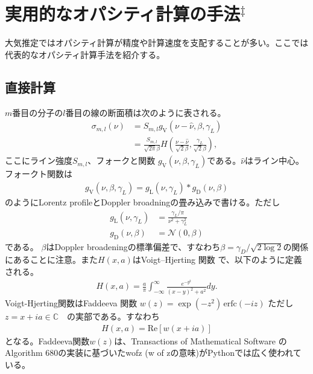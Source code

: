 \section{実用的なオパシティ計算の手法$^\ddagger$}

大気推定ではオパシティ計算が精度や計算速度を支配することが多い。ここでは代表的なオパシティ計算手法を紹介する。

\subsection*{直接計算}

$m$番目の分子の$l$番目の線の断面積は次のように表される。
\begin{align}
  \sigma_{m,l}(\nu) &= S_{m,l} g_\mathrm{V}(\nu - \hat{\nu} , \beta, \gamma_L) \\
  &= \frac{S_{m,l}}{\sqrt{2 \pi} \beta} H\left( \frac{\nu -\hat{\nu}}{\sqrt{2} \beta},\frac{\gamma_L}{\sqrt{2} \beta} \right),
\end{align}
ここにライン強度$S_{m,l}$、フォークと関数 $g_\mathrm{V}(\nu, \beta, \gamma_L)$である。$\hat{\nu} $はライン中心。フォークト関数は
\begin{align}
g_\mathrm{V}(\nu, \beta, \gamma_L) = g_\mathrm{L} (\nu,\gamma_L) \ast g_\mathrm{D} (\nu,\beta) 
\end{align}
のようにLorentz profileとDoppler broadningの畳み込みで書ける。ただし
\begin{align}
 g_\mathrm{L} (\nu,\gamma_L) &= \frac{\gamma_L/\pi}{\nu^2 + \gamma_L^2} \\
 g_\mathrm{D} (\nu,\beta) &= \mathcal{N} (0, \beta)
\end{align}
である。 $\beta$はDoppler broadeningの標準偏差で、すなわち$\beta = \gamma_D/\sqrt{2 \log{2}}$の関係にあることに注意。また$H(x,a)$はVoigt--Hjerting 関数 \cite{1938ApJ....88..508H}で、以下のように定義される。
\begin{align}
H(x,a) = \frac{a}{\pi} \int_{-\infty}^{\infty} \frac{e^{-y^2}}{(x-y)^2 + a^2} dy.
\end{align}
Voigt-Hjerting関数はFaddeeva 関数 $w(z) = \exp{(-z^2)} \, \mathrm{erfc}(-i z)$ ただし $z = x + i a \in \mathbb{C}$　の実部である。すなわち
\begin{align}
H(x,a) = \mathrm{Re}[w(x +i a)]
\end{align}
となる。Faddeeva関数$w(z)$は、Transactions of Mathematical Software \cite{poppe1990algorithm} のAlgorithm 680の実装に基づいた{\sf wofz} (w of zの意味)がPythonでは広く使われている。


